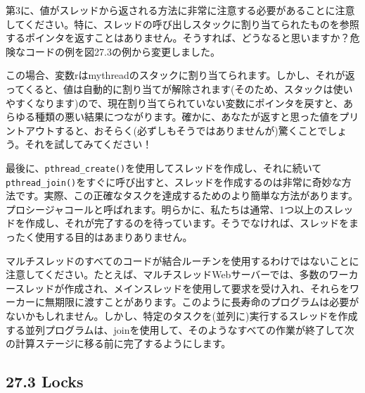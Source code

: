第3に、値がスレッドから返される方法に非常に注意する必要があることに注意してください。特に、スレッドの呼び出しスタックに割り当てられたものを参照するポインタを返すことはありません。そうすれば、どうなると思いますか？危険なコードの例を図27.3の例から変更しました。

\begin{Shaded}
\begin{Highlighting}[]
 
\NormalTok{;}
\NormalTok{;}
 \NormalTok{ (}
\NormalTok{ \}}
\end{Highlighting}
\end{Shaded}

この場合、変数rはmythreadのスタックに割り当てられます。しかし、それが返ってくると、値は自動的に割り当てが解除されます(そのため、スタックは使いやすくなります)ので、現在割り当てられていない変数にポインタを戻すと、あらゆる種類の悪い結果につながります。確かに、あなたが返すと思った値をプリントアウトすると、おそらく(必ずしもそうではありませんが)驚くことでしょう。それを試してみてください！

最後に、\texttt{pthread\_create()}を使用してスレッドを作成し、それに続いて\texttt{pthread\_join()}をすぐに呼び出すと、スレッドを作成するのは非常に奇妙な方法です。実際、この正確なタスクを達成するためのより簡単な方法があります。プロシージャコールと呼ばれます。明らかに、私たちは通常、1つ以上のスレッドを作成し、それが完了するのを待っています。そうでなければ、スレッドをまったく使用する目的はあまりありません。

マルチスレッドのすべてのコードが結合ルーチンを使用するわけではないことに注意してください。たとえば、マルチスレッドWebサーバーでは、多数のワーカースレッドが作成され、メインスレッドを使用して要求を受け入れ、それらをワーカーに無期限に渡すことがあります。このように長寿命のプログラムは必要がないかもしれません。しかし、特定のタスクを(並列に)実行するスレッドを作成する並列プログラムは、joinを使用して、そのようなすべての作業が終了して次の計算ステージに移る前に完了するようにします。

\hypertarget{locks}{%
\subsection*{27.3 Locks}\label{locks}}

